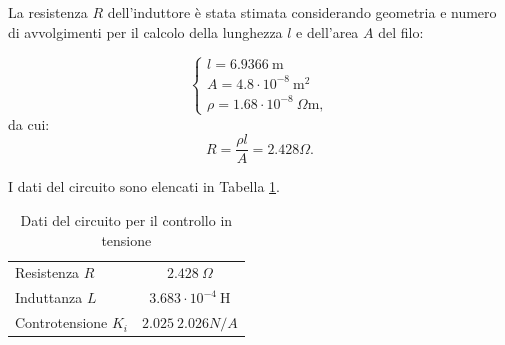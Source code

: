 La resistenza $R$ dell'induttore è stata stimata considerando geometria e numero di avvolgimenti per il calcolo della lunghezza $l$ e dell'area $A$ del filo:

\begin{equation}
\label{eq:8resistenza1}
\left\{
\begin{array}{l}
l = 6.9366 ~\text{m}\\
A = 4.8\cdot10^{-8} ~\text{m}^2\\
\rho = 1.68\cdot10^{-8}~\Omega\text{m},
\end{array}\right.
\end{equation}
da cui:
\begin{equation}
\label{eq:8resistenza2}
R = \frac{\rho l}{A} = 2.428 \Omega.
\end{equation}

I dati del circuito sono elencati in Tabella \ref{tab:8tensioncontrolscheme}.

\begin{table}
\centering
\caption{Dati del circuito per il controllo in tensione}
\label{tab:8tensioncontrolscheme}
\begin{tabular}{lc}
\toprule
Resistenza $R$ & $2.428 ~\Omega$\\
Induttanza $L$ & $3.683\cdot10^{-4}~\text{H}$\\
Controtensione $K_i$ &  $2.025 ~ 2.026 N/A$\\
\bottomrule
\end{tabular}
\end{table}

